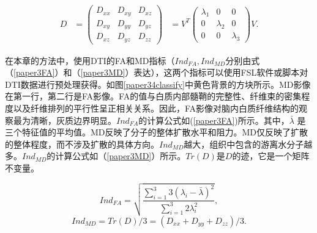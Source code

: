 \begin{equation}\label{paper3dti}
\begin{aligned}
D &=\left(\begin{array}{lll}
D_{xx} & D_{xy} & D_{xz} \\
D_{xy} & D_{yy} & D_{yz} \\
D_{xz} & D_{yz} & D_{zz}
\end{array}\right) & = V^T\left(\begin{array}{ccc}
\lambda_{1} & 0 & 0 \\
0 & \lambda_{2} & 0 \\
0 & 0 & \lambda_{3}
\end{array}\right)V.
\end{aligned}
\end{equation}

在本章的方法中，使用DTI的FA和MD指标（$Ind_{FA}, Ind_{MD}$分别由式（\ref{paper3FA}）和（\ref{paper3MD}）表达），这两个指标可以使用FSL软件或脚本对DTI数据进行预处理获得。如图\ref{paper34classify}中黄色背景的方块所示。MD影像在第一行，第二行是FA影像。FA的值与白质内部髓鞘的完整性、纤维束的密集程度以及纤维排列的平行性呈正相关关系。因此，FA影像对脑内白质纤维结构的观察最为清晰，灰质边界明显。$Ind_{FA}$的计算公式如(\ref{paper3FA})所示。其中，$\bar{\lambda}$ 是三个特征值的平均值。MD反映了分子的整体扩散水平和阻力。MD仅反映了扩散的整体程度，而不涉及扩散的具体方向。$Ind_{MD}$越大，组织中包含的游离水分子越多。$Ind_{MD}$的计算公式如（\ref{paper3MD}）所示。$Tr(D)$是$D$的迹，它是一个矩阵不变量。

 \begin{equation}\label{paper3FA}
Ind_{FA}=\sqrt{\frac{\sum_{i=1}^{3}3\left(\lambda_{i}-\bar{\lambda}\right)^{2}}{\sum_{i=1}^{3}2\lambda_{i}^{2}}},
\end{equation}
\begin{equation}\label{paper3MD}
Ind_{MD}=Tr(D)/3=\left(D_{xx}+D_{yy}+D_{zz}\right)/{3}.
\end{equation}


